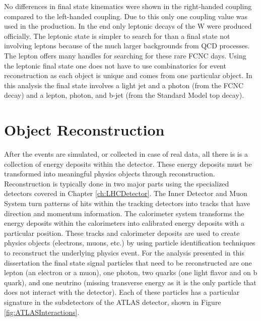 No differences in final state kinematics were shown in the right-handed coupling compared to the left-handed coupling.  Due to this only one coupling value was used in the production.  In the end only leptonic decays of the W were produced officially.  The leptonic state is simpler to search for than a final state not involving leptons because of the much larger backgrounds from QCD processes.  The lepton offers many handles for searching for these rare FCNC days.  Using the leptonic final state one does not have to use combinatorics for event reconstruction as each object is unique and comes from one particular object.  In this analysis the final state involves a light jet and a photon (from the FCNC decay) and a lepton, photon, and b-jet (from the Standard Model top decay).




\section{Object Reconstruction}

After the events are simulated, or collected in case of real data, all there is is a collection of energy deposits within the detector.  These energy deposits must be transformed into meaningful physics objects through reconstruction.  Reconstruction is typically done in two major parts using the specialized detectors covered in Chapter \ref{ch:LHCDetector}.  The Inner Detector and Muon System turn patterns of hits within the tracking detectors into tracks that have direction and momentum information.  The calorimeter system transforms the energy deposits within the calorimeters into calibrated energy deposits with a particular position.  These tracks and calorimeter deposits are used to create physics objects (electrons, muons, etc.) by using particle identification techniques to reconstruct the underlying physics event.  For the analysis presented in this dissertation the final state signal particles that need to be reconstructed are one lepton (an electron or a muon), one photon, two quarks (one light flavor and on b quark), and one neutrino (missing transverse energy as it is the only particle that does not interact with the detector).  Each of these particles has a particular signature in the subdetectors of the ATLAS detector, shown in Figure \ref{fig:ATLASInteractions}.

